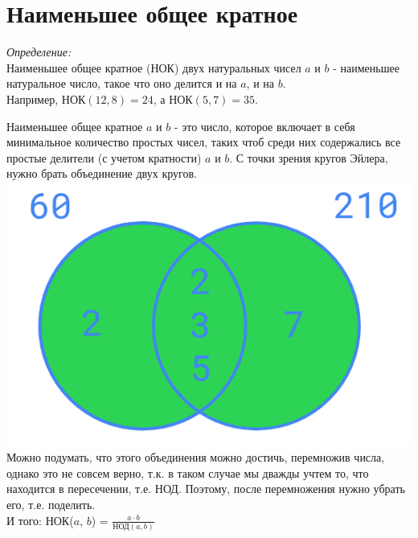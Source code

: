\documentclass[12pt]{article} %
\begin{document}
\section{Наименьшее общее кратное}
\begin{tcolorbox}[colback=white, colframe=black]
	\textit{Определение:}\\
	Наименьшее общее кратное (НОК) двух натуральных чисел $a$ и $b$ - наименьшее натуральное число, такое что оно делится и на $a$, и на $b$.\\
	Например, $\mathrm{\text{НОК}}(12, 8) = 24$, а $\mathrm{\text{НОК}}(5, 7) = 35$.
\end{tcolorbox}
\newpage
Наименьшее общее кратное $a$ и $b$ - это число, которое включает в себя минимальное количество простых чисел, таких чтоб среди них содержались все простые делители (с учетом кратности) $a$ и $b$. С точки зрения кругов Эйлера, нужно брать объединение двух кругов.\\
\includegraphics[scale=0.7]{lcm.png}\\
Можно подумать, что этого объединения можно достичь, перемножив числа, однако это не совсем верно, т.к. в таком случае мы дважды учтем то, что находится в пересечении, т.е. НОД. Поэтому, после перемножения нужно убрать его, т.е. поделить.\\
И того: НОК($a$, $b$) = $\frac{a\cdot b}{\text{НОД}(a, b)}$
\end{document}
